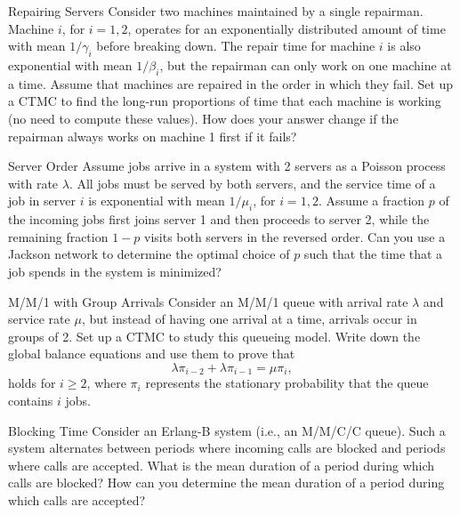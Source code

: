 \begin{problem}{Repairing Servers}
Consider two machines maintained by a single repairman. Machine \( i \), for \( i = 1, 2 \), operates for an exponentially distributed amount of time with mean \( 1/\gamma_i \) before breaking down. The repair time for machine \( i \) is also exponential with mean \( 1/\beta_i \), but the repairman can only work on one machine at a time. Assume that machines are repaired in the order in which they fail. Set up a CTMC to find the long-run proportions of time that each machine is working (no need to compute these values). How does your answer change if the repairman always works on machine 1 first if it fails?
\end{problem}

\begin{problem}{Server Order}
Assume jobs arrive in a system with 2 servers as a Poisson process with rate \( \lambda \). All jobs must be served by both servers, and the service time of a job in server \( i \) is exponential with mean \( 1/\mu_i \), for \( i = 1, 2 \). Assume a fraction \( p \) of the incoming jobs first joins server 1 and then proceeds to server 2, while the remaining fraction \( 1 - p \) visits both servers in the reversed order. Can you use a Jackson network to determine the optimal choice of \( p \) such that the time that a job spends in the system is minimized?
\end{problem}

\begin{problem}{M/M/1 with Group Arrivals}
Consider an M/M/1 queue with arrival rate \( \lambda \) and service rate \( \mu \), but instead of having one arrival at a time, arrivals occur in groups of 2. Set up a CTMC to study this queueing model. Write down the global balance equations and use them to prove that
   \[
   \lambda \pi_{i-2} + \lambda \pi_{i-1} = \mu \pi_i,
   \]
   holds for \( i \geq 2 \), where \( \pi_i \) represents the stationary probability that the queue contains \( i \) jobs.
\end{problem}

\begin{problem}{Blocking Time}
Consider an Erlang-B system (i.e., an M/M/C/C queue). Such a system alternates between periods where incoming calls are blocked and periods where calls are accepted. What is the mean duration of a period during which calls are blocked? How can you determine the mean duration of a period during which calls are accepted?
\end{problem}
